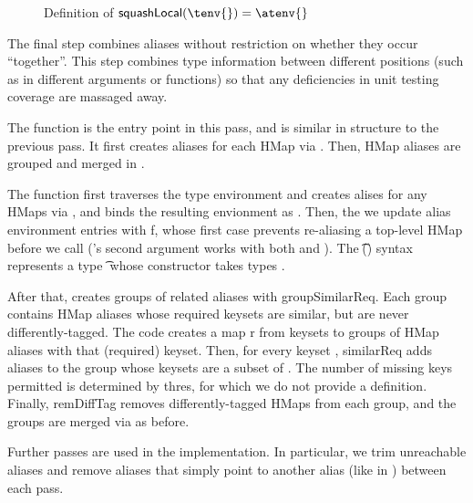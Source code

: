\begin{figure*}
\begin{mathpar}
\end{mathpar}
\caption{Definition of $\squashlocal{}(\tenv{}) = \atenv{}$
  }
  \label{infer:fig:squashlocal}
\end{figure*}

\label{infer:sec:formal:inference-phase:squash-global}

The final step combines aliases
without restriction on whether they occur ``together''.
This step combines type information between different positions
(such as in different arguments or functions) so that any deficiencies
in unit testing coverage are massaged away.

The \squashglobal{} function is the entry point in this pass,
and is similar in structure to the previous pass.
It first creates aliases for each HMap via \aliassinglehmap{}.
Then, HMap aliases are grouped and merged in \squashhorizonally{}.

The \aliassinglehmap{} function first traverses the type environment
and creates alises for any HMaps via \singlehmap{}, and binds the resulting
envionment as \atenvp{}.
Then, the we update alias environment entries with \textsf{f}, whose first
case prevents re-aliasing a top-level HMap before we call \singlehmap{}
(\singlehmap{}'s second argument works with both \x{} and \alias{}).
The \t{}(\ova{\s{}}) syntax represents a type \t{} whose constructor
takes types \ova{\s{}}.

After that, \squashhorizonally{} creates groups of related
aliases with \textsf{groupSimilarReq}.
Each group contains HMap aliases whose required keysets are similar,
but are never differently-tagged.
The code creates a map \textsf{r} from keysets to groups of HMap
aliases with that (required) keyset.
Then, for every keyset \ova{\kw{}}, \textsf{similarReq} adds aliases to the group
whose keysets are a subset of \ova{\kw{}}. The number of missing
keys permitted is determined by \textsf{thres}, for which we do not provide a
definition.
Finally, \textsf{remDiffTag} removes differently-tagged HMaps from each group,
and the groups are merged via \mergealiases{} as before.


Further passes are used in the implementation.
In particular, we trim unreachable aliases and remove aliases
that simply point to another alias (like  in \mergealiases{})
between each pass.

